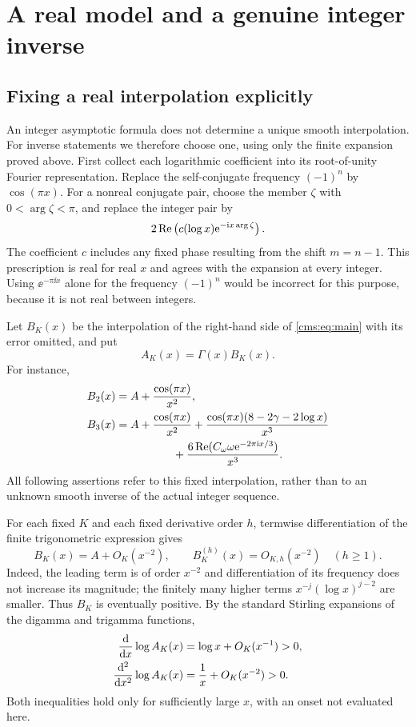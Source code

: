 \section{A real model and a genuine integer inverse}\label{cms:sec:inverse}
\subsection{Fixing a real interpolation explicitly}
An integer asymptotic formula does not determine a unique smooth interpolation. For inverse statements we therefore choose one, using only the finite expansion proved above. First collect each logarithmic coefficient into its root-of-unity Fourier representation. Replace the self-conjugate frequency $(-1)^n$ by $\cos(\pi x)$. For a nonreal conjugate pair, choose the member $\zeta$ with $0<\arg\zeta<\pi$, and replace the integer pair by
\begin{equation}\label{cms:eq:interpolation}
2\operatorname{Re}\left(c(\log x)\mathrm e^{-\mathrm i x\arg\zeta}\right).
\end{equation}
The coefficient $c$ includes any fixed phase resulting from the shift $m=n-1$. This prescription is real for real $x$ and agrees with the expansion at every integer. Using $\ee^{-\pi\ii x}$ alone for the frequency $(-1)^n$ would be incorrect for this purpose, because it is not real between integers.

Let $B_K(x)$ be the interpolation of the right-hand side of \eqref{cms:eq:main} with its error omitted, and put
\begin{equation}\label{cms:eq:AK}
A_K(x)=\Gamma(x)B_K(x).
\end{equation}
For instance,
\begin{align}\label{cms:eq:Bmodels}
B_2(x)&=A+\frac{\cos(\pi x)}{x^2},\\
B_3(x)&=A+\frac{\cos(\pi x)}{x^2}
+\frac{\cos(\pi x)(8-2\gamma-2\log x)}{x^3}\notag\\
&\hspace{18mm}+\frac{6\Rea(C_\om\om\ee^{-2\pi\ii x/3})}{x^3}.\notag
\end{align}
All following assertions refer to this fixed interpolation, rather than to an unknown smooth inverse of the actual integer sequence.

For each fixed $K$ and each fixed derivative order $h$, termwise differentiation of the finite trigonometric expression gives
\begin{equation}\label{cms:eq:Bderivative}
B_K(x)=A+O_K(x^{-2}),\qquad B_K^{(h)}(x)=O_{K,h}(x^{-2})\quad(h\geq1).
\end{equation}
Indeed, the leading term is of order $x^{-2}$ and differentiation of its frequency does not increase its magnitude; the finitely many higher terms $x^{-j}(\log x)^{j-2}$ are smaller. Thus $B_K$ is eventually positive. By the standard Stirling expansions of the digamma and trigamma functions,
\begin{align}\label{cms:eq:logderivatives}
\frac{\mathrm d}{\mathrm dx}\log A_K(x)
&=\log x+O_K(x^{-1})>0,\\
\frac{\mathrm d^2}{\mathrm dx^2}\log A_K(x)
&=\frac1x+O_K(x^{-2})>0.\notag
\end{align}
Both inequalities hold only for sufficiently large $x$, with an onset not evaluated here.

